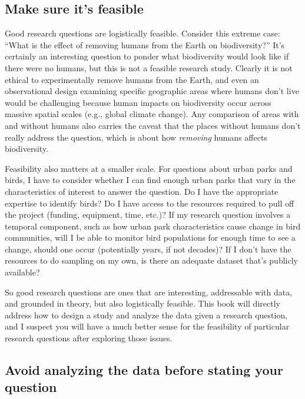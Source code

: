 \documentclass[
]{book}
\begin{document}
\subsection{Make sure it's feasible}\label{make-sure-its-feasible}

Good research questions are logistically feasible. Consider this extreme case: ``What is the effect of removing humans from the Earth on biodiversity?'' It's certainly an interesting question to ponder what biodiversity would look like if there were no humans, but this is not a feasible research study. Clearly it is not ethical to experimentally remove humans from the Earth, and even an observational design examining specific geographic areas where humans don't live would be challenging because human impacts on biodiversity occur across massive spatial scales (e.g., global climate change). Any comparison of areas with and without humans also carries the caveat that the places without humans don't really address the question, which is about how \emph{removing} humans affects biodiversity.

Feasibility also matters at a smaller scale. For questions about urban parks and birds, I have to consider whether I can find enough urban parks that vary in the characteristics of interest to answer the question. Do I have the appropriate expertise to identify birds? Do I have access to the resources required to pull off the project (funding, equipment, time, etc.)? If my research question involves a temporal component, such as how urban park characteristics cause change in bird communities, will I be able to monitor bird populations for enough time to see a change, should one occur (potentially years, if not decades)? If I don't have the resources to do sampling on my own, is there an adequate dataset that's publicly available?

So good research questions are ones that are interesting, addressable with data, and grounded in theory, but also logistically feasible. This book will directly address how to design a study and analyze the data given a research question, and I suspect you will have a much better sense for the feasibility of particular research questions after exploring those issues.

\subsection{Avoid analyzing the data before stating your question}\label{avoid-analyzing-the-data-before-stating-your-question}
\end{document}
